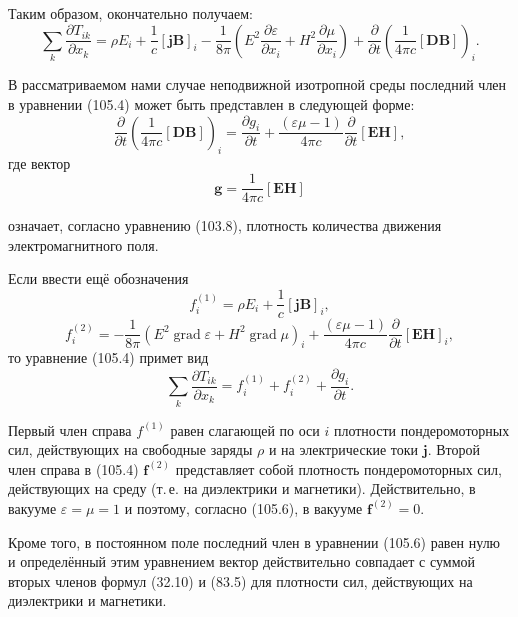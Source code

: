 \documentclass[a4paper,12pt]{article}
\begin{document}
Таким образом, окончательно получаем:
\begin{equation}
    \sum_k\frac{\partial T_{ik}}{\partial x_k}
    = \rho E_i + \frac{1}{c}[\mathbf{j}\mathbf{B}]_i
    - \frac{1}{8\pi}\!\left(
        E^2\frac{\partial\varepsilon}{\partial x_i}
      + H^2\frac{\partial\mu}{\partial x_i}
    \right)
    + \frac{\partial}{\partial t}\!\left(\frac{1}{4\pi c}[\mathbf{D}\mathbf{B}]\right)_i.
    \tag{105.4}
\end{equation}

В рассматриваемом нами случае неподвижной изотропной среды последний
член в уравнении (105.4) может быть представлен в следующей форме:
$$
    \frac{\partial}{\partial t}\!\left(\frac{1}{4\pi c}[\mathbf{D}\mathbf{B}]\right)_i
    = \frac{\partial g_i}{\partial t}
    + \frac{(\varepsilon\mu - 1)}{4\pi c}\frac{\partial}{\partial t}[\mathbf{E}\mathbf{H}],
$$
где вектор
$$
    \mathbf{g} = \frac{1}{4\pi c}[\mathbf{E}\mathbf{H}]
$$


означает, согласно уравнению (103.8), плотность количества движения
электромагнитного поля.

Если ввести ещё обозначения
\begin{equation}
    f_i^{(1)} = \rho E_i + \frac{1}{c}[\mathbf{j}\mathbf{B}]_i,
    \tag{105.5}
\end{equation}
\begin{equation}
    f_i^{(2)} = -\frac{1}{8\pi}\!\left(
        E^2\operatorname{grad}\varepsilon + H^2\operatorname{grad}\mu
    \right)_i
    + \frac{(\varepsilon\mu - 1)}{4\pi c}\frac{\partial}{\partial t}[\mathbf{E}\mathbf{H}]_i,
    \tag{105.6}
\end{equation}
то уравнение (105.4) примет вид
\begin{equation}
    \sum_k\frac{\partial T_{ik}}{\partial x_k}
    = f_i^{(1)} + f_i^{(2)} + \frac{\partial g_i}{\partial t}.
    \tag{105.7}
\end{equation}

Первый член справа $f^{(1)}$ равен слагающей по оси $i$ плотности
пондеромоторных сил, действующих на свободные заряды $\rho$ и на
электрические токи $\mathbf{j}$. Второй член справа в (105.4)
$\mathbf{f}^{(2)}$ представляет собой плотность пондеромоторных сил,
действующих на среду (т.\,е. на диэлектрики и магнетики). Действительно,
в вакууме $\varepsilon = \mu = 1$ и поэтому, согласно (105.6), в вакууме
$\mathbf{f}^{(2)} = 0$.

Кроме того, в постоянном поле последний член в уравнении (105.6)
равен нулю и определённый этим уравнением вектор действительно совпадает
с суммой вторых членов формул (32.10) и (83.5) для плотности сил,
действующих на диэлектрики и магнетики.
\end{document}
